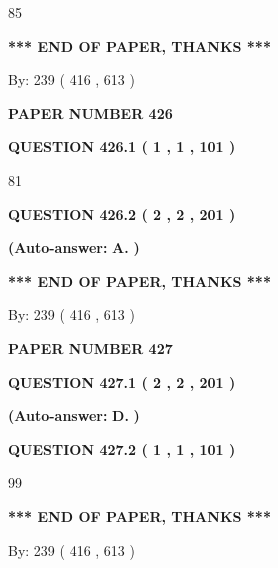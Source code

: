 \documentclass{ctexart}
\begin{document}
85
   
   
   
   
\vspace{1.0in} 
{\textbf{\large{ *** END OF PAPER, THANKS *** }}} 
   
   
\hspace{1.0in} By: 
 239 ( 416 ,  613 )
   
   
   
   
\newpage 
\setcounter{page}{ 
   426001 } 
   
   
 {\textbf{ \Large{ PAPER NUMBER  426  }}}
   
   
   
   
  
  
{\textbf{\large{QUESTION
426.1 
 ( 1 , 1 , 101 )
}}}

81
  
  
{\textbf{\large{QUESTION
426.2 
 ( 2 , 2 , 201 )
}}}
 
 
{\textbf{(Auto-answer:}}
{\textbf{\large{
A.}}}
{\textbf{)}}
 
 
   
   
   
   
\vspace{1.0in} 
{\textbf{\large{ *** END OF PAPER, THANKS *** }}} 
   
   
\hspace{1.0in} By: 
 239 ( 416 ,  613 )
   
   
   
   
\newpage 
\setcounter{page}{ 
   427001 } 
   
   
 {\textbf{ \Large{ PAPER NUMBER  427  }}}
   
   
   
   
  
  
{\textbf{\large{QUESTION
427.1 
 ( 2 , 2 , 201 )
}}}
 
 
{\textbf{(Auto-answer:}}
{\textbf{\large{
D.}}}
{\textbf{)}}
 
 
  
  
{\textbf{\large{QUESTION
427.2 
 ( 1 , 1 , 101 )
}}}

99
   
   
   
   
\vspace{1.0in} 
{\textbf{\large{ *** END OF PAPER, THANKS *** }}} 
   
   
\hspace{1.0in} By: 
 239 ( 416 ,  613 )
   
   
   
   
\newpage 
\setcounter{page}{ 
   428001 } 
   
\end{document}
